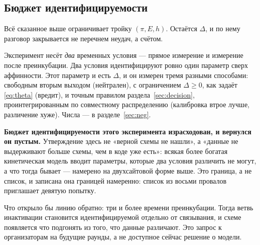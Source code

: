 \subsection{Бюджет идентифицируемости}

Всё сказанное выше ограничивает тройку $(\pi, E, h)$. Остаётся $\Delta$, и по нему разговор
закрывается не перечнем неудач, а счётом.

Эксперимент несёт \emph{два} временных условия --- прямое измерение и измерение после преинкубации.
Два условия идентифицируют ровно один параметр сверх аффинности. Этот параметр и есть $\Delta$, и он
измерен тремя разными способами: свободным вторым выходом (нейтрален), с ограничением
$\Delta \ge 0$, как задаёт \eqref{eq:theta} (вредит), и точным правилом раздела~\ref{sec:decision},
проинтегрированным по совместному распределению (калибровка втрое лучше, различение хуже). Числа --- в
разделе~\ref{sec:neg}.

\textbf{Бюджет идентифицируемости этого эксперимента израсходован, и вернулся он пустым.} Утверждение
здесь не «верной схемы не нашли», а «данные не выдерживают больше схемы, чем в коде уже есть»: всякая
более богатая кинетическая модель вводит параметры, которые два условия различить не могут, а что
тогда бывает --- намерено на двухсайтовой форме выше. Это граница, а не список, и записана она
границей намеренно: список из восьми провалов приглашает девятую попытку.

Что открыло бы линию обратно: три и более времени преинкубации. Тогда ветвь инактивации становится
идентифицируемой отдельно от связывания, и схеме появляется что подгонять из того, что данные
различают. Это запрос к организаторам на будущие раунды, а не доступное сейчас решение о модели.
